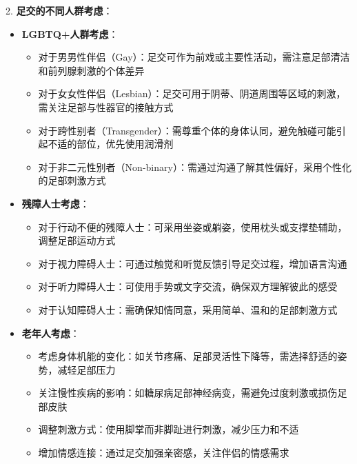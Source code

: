 \documentclass[12pt,UTF8]{ctexbook}
\begin{document}
2. \textbf{足交的不同人群考虑}：
\begin{itemize}
	\item \textbf{LGBTQ+人群考虑}：
	\begin{itemize}
		\item 对于男男性伴侣（Gay）：足交可作为前戏或主要性活动，需注意足部清洁和前列腺刺激的个体差异
		\item 对于女女性伴侣（Lesbian）：足交可用于阴蒂、阴道周围等区域的刺激，需关注足部与性器官的接触方式
		\item 对于跨性别者（Transgender）：需尊重个体的身体认同，避免触碰可能引起不适的部位，优先使用润滑剂
		\item 对于非二元性别者（Non-binary）：需通过沟通了解其性偏好，采用个性化的足部刺激方式
	\end{itemize}
	\item \textbf{残障人士考虑}：
	\begin{itemize}
		\item 对于行动不便的残障人士：可采用坐姿或躺姿，使用枕头或支撑垫辅助，调整足部运动方式
		\item 对于视力障碍人士：可通过触觉和听觉反馈引导足交过程，增加语言沟通
		\item 对于听力障碍人士：可使用手势或文字交流，确保双方理解彼此的感受
		\item 对于认知障碍人士：需确保知情同意，采用简单、温和的足部刺激方式
	\end{itemize}
	\item \textbf{老年人考虑}：
	\begin{itemize}
		\item 考虑身体机能的变化：如关节疼痛、足部灵活性下降等，需选择舒适的姿势，减轻足部压力
		\item 关注慢性疾病的影响：如糖尿病足部神经病变，需避免过度刺激或损伤足部皮肤
		\item 调整刺激方式：使用脚掌而非脚趾进行刺激，减少压力和不适
		\item 增加情感连接：通过足交加强亲密感，关注伴侣的情感需求
	\end{itemize}
\end{itemize}
\end{document}
